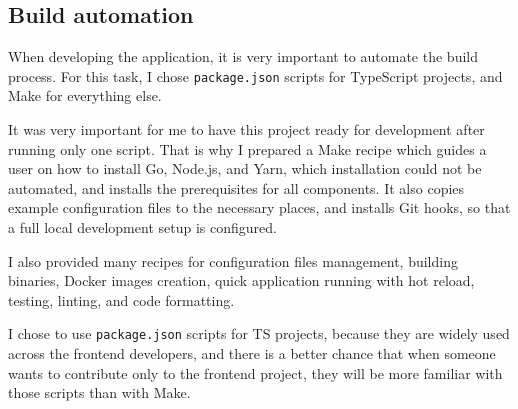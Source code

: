 \subsection{Build automation}\label{sec:build-automation}

When developing the application,
it is very important to automate the build process.
For this task,
I chose \texttt{package.json} scripts
for TypeScript projects,
and Make for everything else.

It was very important for me
to have this project ready for development
after running only one script.
That is why I prepared a Make recipe
which guides a user on how to install
Go, Node.js, and Yarn,
which installation could not be automated,
and installs the prerequisites for all components.
It also copies example configuration files
to the necessary places,
and installs Git hooks,
so that a full local development setup
is configured.

I also provided many recipes
for configuration files management,
building binaries,
Docker images creation,
quick application running with hot reload,
testing,
linting, and
code formatting.

I chose to use \texttt{package.json} scripts
for TS projects,
because they are widely used
across the frontend developers,
and there is a better chance
that when someone wants to contribute
only to the frontend project,
they will be more familiar with those scripts
than with Make.
